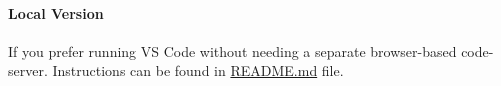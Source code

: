 \paragraph{Local Version}
\label{sect:local-vscode}
\noindent If you prefer running VS Code without needing a separate browser-based code-server. Instructions can be found in  \href{https://github.com/NAG-DevOps/speed-hpc/blob/master/src/vscode}{README.md} file.